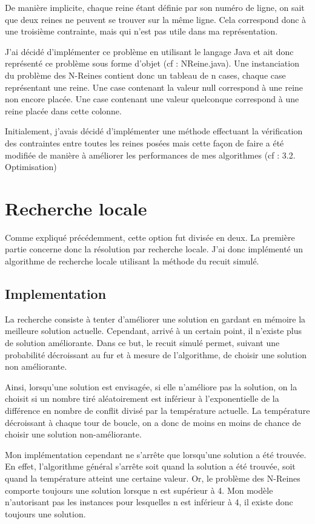 \documentclass[a4paper,10pt]{article}
\begin{document}
De manière implicite, chaque reine étant définie par son numéro de ligne, on sait que deux reines ne peuvent se trouver sur la même ligne. Cela correspond donc à une troisième contrainte, mais qui n'est pas utile dans ma représentation.

J'ai décidé d'implémenter ce problème en utilisant le langage Java et ait donc représenté ce problème sous forme d'objet (cf : NReine.java). Une instanciation du problème des N-Reines contient donc un tableau de n cases, chaque case représentant une reine. Une case contenant la valeur null correspond à une reine non encore placée. Une case contenant une valeur quelconque correspond à une reine placée dans cette colonne.

Initialement, j'avais décidé d'implémenter une méthode effectuant la vérification des contraintes entre toutes les reines posées mais cette façon de faire a été modifiée de manière à améliorer les performances de mes algorithmes (cf : 3.2. Optimisation)

\section{Recherche locale}

Comme expliqué précédemment, cette option fut divisée en deux. La première partie concerne donc la résolution par recherche locale. J'ai donc implémenté un algorithme de recherche locale utilisant la méthode du recuit simulé.

\subsection{Implementation}

La recherche consiste à tenter d'améliorer une solution en gardant en mémoire la meilleure solution actuelle. Cependant, arrivé à un certain point, il n'existe plus de solution améliorante. Dans ce but, le recuit simulé permet, suivant une probabilité décroissant au fur et à mesure de l'algorithme, de choisir une solution non améliorante.

Ainsi, lorsqu'une solution est envisagée, si elle n'améliore pas la solution, on la choisit si un nombre tiré aléatoirement est inférieur à l'exponentielle de la différence en nombre de conflit divisé par la température actuelle. La température décroissant à chaque tour de boucle, on a donc de moins en moins de chance de choisir une solution non-améliorante.

Mon implémentation cependant ne s'arrête que lorsqu'une solution a été trouvée. En effet, l'algorithme général s'arrête soit quand la solution a été trouvée, soit quand la température atteint une certaine valeur. Or, le problème des N-Reines comporte toujours une solution lorsque n est supérieur à 4. Mon modèle n'autorisant pas les instances pour lesquelles n est inférieur à 4, il existe donc toujours une solution.
\end{document}
